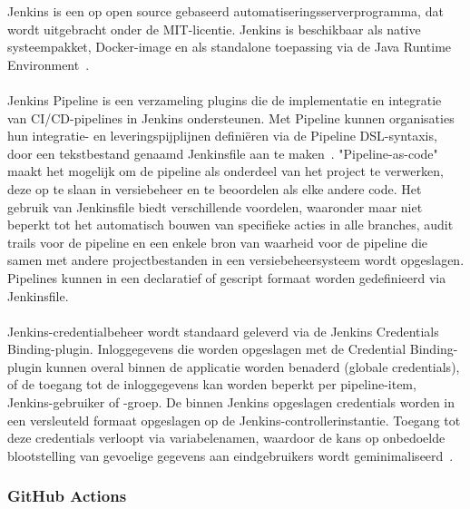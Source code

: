 Jenkins is een op open source gebaseerd automatiseringsserverprogramma, dat wordt uitgebracht onder de MIT-licentie. Jenkins is beschikbaar als native systeempakket, Docker-image en als standalone toepassing via de Java Runtime Environment~\autocite{jenkinsinstalling}. 
\\\\
Jenkins Pipeline is een verzameling plugins die de implementatie en integratie van CI/CD-pipelines in Jenkins ondersteunen. Met Pipeline kunnen organisaties hun integratie- en leveringspijplijnen definiëren via de Pipeline DSL-syntaxis, door een tekstbestand genaamd Jenkinsfile aan te maken~\autocite{jenkinspipeline}. "Pipeline-as-code" maakt het mogelijk om de pipeline als onderdeel van het project te verwerken, deze op te slaan in versiebeheer en te beoordelen als elke andere code. Het gebruik van Jenkinsfile biedt verschillende voordelen, waaronder maar niet beperkt tot het automatisch bouwen van specifieke acties in alle branches, audit trails voor de pipeline en een enkele bron van waarheid voor de pipeline die samen met andere projectbestanden in een versiebeheersysteem wordt opgeslagen. Pipelines kunnen in een declaratief of gescript formaat worden gedefinieerd via Jenkinsfile.~\autocite{jenkinsjenkinsfile}
\\\\
Jenkins-credentialbeheer wordt standaard geleverd via de Jenkins Credentials Binding-plugin. Inloggegevens die worden opgeslagen met de Credential Binding-plugin kunnen overal binnen de applicatie worden benaderd (globale credentials), of de toegang tot de inloggegevens kan worden beperkt per pipeline-item, Jenkins-gebruiker of -groep. De binnen Jenkins opgeslagen credentials worden in een versleuteld formaat opgeslagen op de Jenkins-controllerinstantie. Toegang tot deze credentials verloopt via variabelenamen, waardoor de kans op onbedoelde blootstelling van gevoelige gegevens aan eindgebruikers wordt geminimaliseerd~\autocite{jenkinscredentials}.

\newpage

\subsubsection{GitHub Actions}

